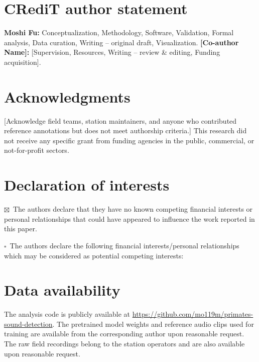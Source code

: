 \documentclass[final,3p,times]{elsarticle}
\begin{document}
\section*{CRediT author statement}

\textbf{Moshi Fu:} Conceptualization, Methodology, Software, Validation,
Formal analysis, Data curation, Writing -- original draft, Visualization.
\textbf{[Co-author Name]:} [Supervision, Resources, Writing -- review \&
editing, Funding acquisition].

\section*{Acknowledgments}

[Acknowledge field teams, station maintainers, and anyone who contributed
reference annotations but does not meet authorship criteria.] This research did
not receive any specific grant from funding agencies in the public,
commercial, or not-for-profit sectors.

\section*{Declaration of interests}

\noindent$\boxtimes$~The authors declare that they have no known competing
financial interests or personal relationships that could have appeared to
influence the work reported in this paper.

\medskip
\noindent$\square$~The authors declare the following financial
interests/personal relationships which may be considered as potential
competing interests:

\section*{Data availability}

The analysis code is publicly available at
\url{https://github.com/mo119m/primates-sound-detection}. The pretrained
model weights and reference audio clips used for training are available from
the corresponding author upon reasonable request. The raw field recordings
belong to the station operators and are also available upon reasonable
request.
\end{document}
